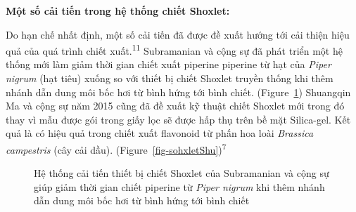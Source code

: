 \documentclass[
  twocolumn,
  landscape]{report}
\begin{document}
\textbf{Một số cải tiến trong hệ thống chiết Shoxlet:}

Do hạn chế nhất định, một số cải tiến đã được đề xuất hướng tới cải
thiện hiệu quả của quá trình chiết xuất.\textsuperscript{11} Subramanian
và cộng sự đã phát triển một hệ thống mới làm giảm thời gian chiết xuất
piperine piperine từ hạt của \emph{Piper nigrum} (hạt tiêu) xuống so với
thiết bị chiết Shoxlet truyền thống khi thêm nhánh dẫn dung môi bốc hơi
từ bình hứng tới bình chiết. (Figure~\ref{fig-sohxletSub}) Shuangqin Ma
và cộng sự năm 2015 cũng đã đề xuất kỹ thuật chiết Shoxlet mới trong đó
thay vì mẫu được gói trong giấy lọc sẽ được hấp thụ trên bề mặt
Silica-gel. Kết quả là có hiệu quả trong chiết xuất flavonoid từ phấn
hoa loài \emph{Brassica campestris} (cây cải dầu).
(Figure~\ref{fig-sohxletShu})\textsuperscript{7}

\begin{figure}


\caption{\label{fig-sohxletSub}Hệ thống cải tiến thiết bị chiết Shoxlet
của Subramanian và cộng sự giúp giảm thời gian chiết piperine từ
\emph{Piper nigrum} khi thêm nhánh dẫn dung môi bốc hơi từ bình hứng tới
bình chiết}

\end{figure}%
\end{document}
